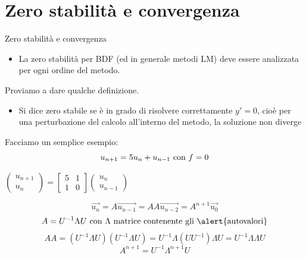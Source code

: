 \documentclass[aspectratio=169, 10pt, handout,usenames,dvipsnames]{beamer}
\begin{document}
\section{Zero stabilità e convergenza}\label{sec:sec9}
    \begin{frame}{Zero stabilità e convergenza}
        \begin{itemize}
            \item La zero stabilità per BDF (ed in generale metodi LM) deve essere analizzata per ogni ordine del metodo.
        \end{itemize}   
        Proviamo a dare qualche definizione.
        \begin{itemize}
            \item Si dice \alert{zero stabile} se è in grado di risolvere correttamente \( y'=0 \), cioè per una perturbazione del calcolo all’interno del metodo, la soluzione non diverge
        \end{itemize}
        
       Facciamo un semplice esempio:
        \[u_{n+1} = 5 u_n + u_{n-1}  \textnormal{ con } f = 0\]
        \begin{center}
         $\begin{pmatrix}
            u_{n+1} \\ 
            u_{n}
         \end{pmatrix}
         =
         \begin{bmatrix}
                    5 & 1 \\
                    1 & 0
         \end{bmatrix}
        \begin{pmatrix}
            u_{n} \\ 
            u_{n-1}
         \end{pmatrix} $
         \end{center}
         \[\vec{u_n} = A \vec{u_{n-1}} = AA \vec{u_{n-2}}= A^{n+1} \vec{u_0} \]
         \[A = U^ {-1} \Lambda U  \textnormal{ con } \Lambda \textnormal{ matrice contenente gli \alert{autovalori}} \]
         \[AA = (U^ {-1} \Lambda U)(U^ {-1} \Lambda U) = U^{-1} \Lambda (U U^{-1}) \Lambda U = U^{-1} \Lambda \Lambda U \]
         \[A^{n+1} = U^{-1} \Lambda^{n+1} U\]
       

\end{frame}
\end{document}
